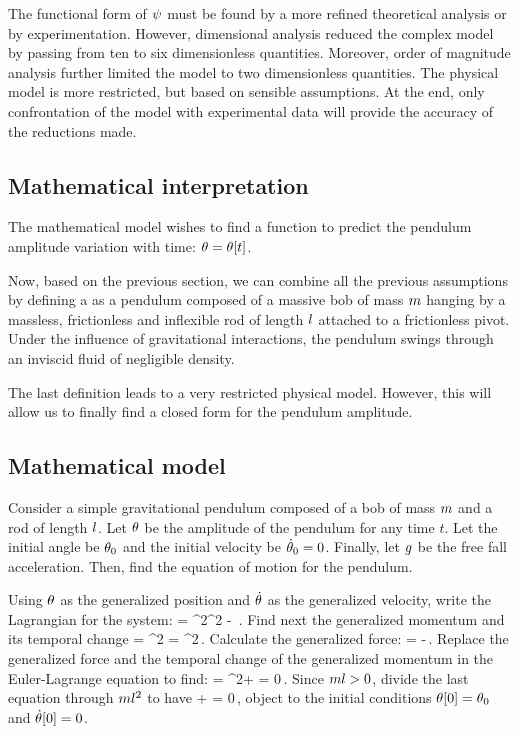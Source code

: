 The functional form of $\psi$ must be found by a more refined theoretical analysis or by experimentation. However, dimensional analysis reduced the complex model by passing from ten to six dimensionless quantities. Moreover, order of magnitude analysis further limited the model to two dimensionless quantities. The physical model is more restricted, but based on sensible assumptions. At the end, only confrontation of the model with experimental data will provide the accuracy of the reductions made.


\subsection{Mathematical interpretation}
The mathematical model wishes to find a function to predict the pendulum amplitude variation with time: $\theta = \theta\!\left[{t}\right]$.

Now, based on the previous section, we can combine all the previous assumptions by defining a  as a pendulum composed of a massive bob of mass $m$ hanging by a massless, frictionless and inflexible rod of length $l$ attached to a frictionless pivot. Under the influence of gravitational interactions, the pendulum swings through an inviscid fluid of negligible density.

The last definition leads to a very restricted physical model. However, this will allow us to finally find a closed form for the pendulum amplitude.


\subsection{Mathematical model}
Consider a simple gravitational pendulum composed of a bob of mass $m$ and a rod of length $l$. Let $\theta$ be the amplitude of the pendulum for any time $t$. Let the initial angle be $\theta_0$ and the initial velocity be $\dot{\theta}_0 = 0$. Finally, let $g$ be the free fall acceleration. Then, find the equation of motion for the pendulum.

Using $\theta$ as the generalized position and $\dot{\theta}$ as the generalized velocity, write the Lagrangian for the system:
\beq
\lag = \mass\length^2\angvel^2 - \mass\grav\length\cos\vat{\angpos}\,.
\eeq
Find next the generalized momentum and its temporal change
\beq
\ipd{\angvel}{\lag} = \mass\length^2\angvel\implies
{}\ipd{\angvel}{\lag} = \mass\length^2\angacc\,.
\eeq
Calculate the generalized force:
\beq
\ipd{\angpos}{\lag} = -\mass\grav\length\sin\vat\angpos\,.
\eeq
Replace the generalized force and the temporal change of the generalized momentum in the Euler-Lagrange equation to find:
\beq
\elop{\angpos}{\angvel}\lag = \mass\length^2\angacc + \mass\grav\length\sin\vat\angpos = 0\,.
\eeq
Since $ml > 0$, divide the last equation through $ml^2$ to have
\beq
\angacc + \dfrac{\grav}{\length}\sin\vat\angpos = 0\,,
\eeq
object to the initial conditions $\theta\!\left[{0}\right] = \theta_0$ and $\dot{\theta}\!\left[{0}\right] = 0$.

